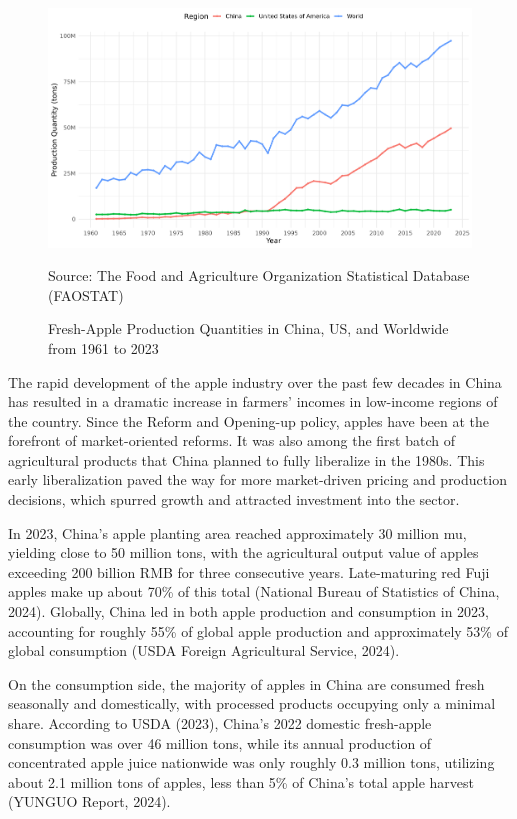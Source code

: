 \begin{figure}[hpt]
    \centering
        \caption{Fresh-Apple Production Quantities in China, US, and Worldwide from 1961 to 2023}
    \includegraphics[width=\linewidth]{figures/production_China_US_world.png}
    \label{fig: production quantity}
    \begin{tablenotes}
    \footnotesize
    \item Source: The Food and Agriculture Organization Statistical Database (FAOSTAT)
    \end{tablenotes}
\end{figure}

The rapid development of the apple industry over the past few decades in China has resulted in a dramatic increase in farmers' incomes in low-income regions of the country. Since the Reform and Opening-up policy, apples have been at the forefront of market-oriented reforms. It was also among the first batch of agricultural products that China planned to fully liberalize in the 1980s. This early liberalization paved the way for more market-driven pricing and production decisions, which spurred growth and attracted investment into the sector.

In 2023, China's apple planting area reached approximately 30 million mu, yielding close to 50 million tons, with the agricultural output value of apples exceeding 200 billion RMB for three consecutive years. Late-maturing red Fuji apples make up about 70\% of this total (National Bureau of Statistics of China, 2024). Globally, China led in both apple production and consumption in 2023, accounting for roughly 55\% of global apple production and approximately 53\% of global consumption (USDA Foreign Agricultural Service, 2024).

On the consumption side, the majority of apples in China are consumed fresh seasonally and domestically, with processed products occupying only a minimal share. According to USDA (2023), China's 2022 domestic fresh-apple consumption was over 46 million tons, while its annual production of concentrated apple juice nationwide was only roughly 0.3 million tons, utilizing about 2.1 million tons of apples, less than 5\% of China's total apple harvest (YUNGUO Report, 2024).

